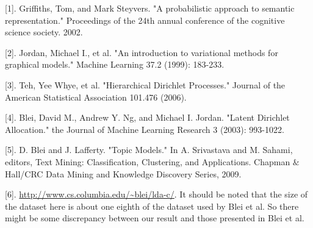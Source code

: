 \documentclass{article} %
\begin{document}
\small{

[1]. Griffiths, Tom, and Mark Steyvers. "A probabilistic approach to semantic representation." Proceedings of the 24th annual conference of the cognitive science society. 2002.

[2]. Jordan, Michael I., et al. "An introduction to variational methods for graphical models." Machine Learning 37.2 (1999): 183-233.

[3]. Teh, Yee Whye, et al. "Hierarchical Dirichlet Processes." Journal of the American Statistical Association 101.476 (2006).

[4]. Blei, David M., Andrew Y. Ng, and Michael I. Jordan. "Latent Dirichlet Allocation." the Journal of Machine Learning Research 3 (2003): 993-1022.

[5]. D. Blei and J. Lafferty. "Topic Models." In A. Srivastava and M. Sahami, editors, Text Mining: Classification, Clustering, and Applications. Chapman $\&$ Hall/CRC Data Mining and Knowledge Discovery Series, 2009.

[6]. \url{http://www.cs.columbia.edu/~blei/lda-c/}. It should be noted that the size of the dataset here is about one eighth of the dataset used by Blei et al. So there might be some discrepancy between our result and those presented in Blei et al.
%
%
}
\end{document}

